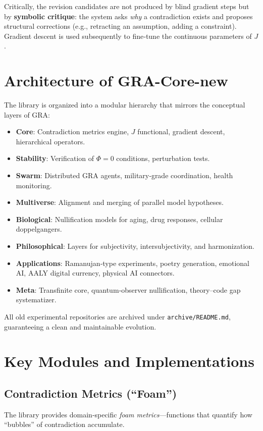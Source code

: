 \documentclass[11pt,a4paper]{article}
\begin{document}
Critically, the revision candidates are not produced by blind gradient steps but by \textbf{symbolic critique}: the system asks \emph{why} a contradiction exists and proposes structural corrections (e.g., retracting an assumption, adding a constraint). Gradient descent is used subsequently to fine‑tune the continuous parameters of $J$.

\section{Architecture of GRA-Core-new}
The library is organized into a modular hierarchy that mirrors the conceptual layers of GRA:

\begin{itemize}[nosep]
    \item \textbf{Core}: Contradiction metrics engine, $J$ functional, gradient descent, hierarchical operators.
    \item \textbf{Stability}: Verification of $\Phi=0$ conditions, perturbation tests.
    \item \textbf{Swarm}: Distributed GRA agents, military‑grade coordination, health monitoring.
    \item \textbf{Multiverse}: Alignment and merging of parallel model hypotheses.
    \item \textbf{Biological}: Nullification models for aging, drug responses, cellular doppelgangers.
    \item \textbf{Philosophical}: Layers for subjectivity, intersubjectivity, and harmonization.
    \item \textbf{Applications}: Ramanujan‑type experiments, poetry generation, emotional AI, AALY digital currency, physical AI connectors.
    \item \textbf{Meta}: Transfinite core, quantum‑observer nullification, theory–code gap systematizer.
\end{itemize}

All old experimental repositories are archived under \texttt{archive/README.md}, guaranteeing a clean and maintainable evolution.

\section{Key Modules and Implementations}
\subsection{Contradiction Metrics (“Foam”)}
The library provides domain‑specific \textit{foam metrics}—functions that quantify how “bubbles” of contradiction accumulate.
\end{document}
